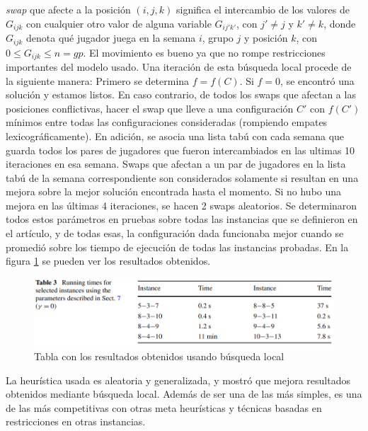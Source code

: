 \documentclass[letter, 10pt]{article}
\begin{document}
\textit{swap} que afecte a la posición $(i,j,k)$ significa el intercambio de los valores de $G_{ijk}$ con cualquier otro valor de alguna variable $G_{ij'k'}$, con $j'\neq j$ y $k'\neq k$, donde $G_{ijk}$ denota qué jugador juega en la semana $i$, grupo $j$ y posición $k$, con $0 \leq G_{ijk} \leq n=gp$. El movimiento es bueno ya que no rompe restricciones importantes del modelo usado. Una iteración de esta búsqueda local procede de la siguiente manera: Primero se determina $f=f(C)$. Si $f=0$, se encontró una solución y estamos listos. En caso contrario, de todos los swaps que afectan a las posiciones conflictivas, hacer el swap que lleve a una configuración $C'$ con $f(C')$ mínimos entre todas las configuraciones consideradas (rompiendo empates lexicográficamente). En adición, se asocia una lista tabú con cada semana que guarda todos los pares de jugadores que fueron intercambiados en las ultimas 10 iteraciones en esa semana. Swaps que afectan a un par de jugadores en la lista tabú de la semana correspondiente son considerados solamente si resultan en una mejora sobre la mejor solución encontrada hasta el momento. Si no hubo una mejora en las últimas 4 iteraciones, se hacen 2 swaps aleatorios. Se determinaron todos estos parámetros en pruebas sobre todas las instancias que se definieron en el artículo, y de todas esas, la configuración dada funcionaba mejor cuando se promedió sobre los tiempo de ejecución de todas las instancias probadas. En la figura \ref{fig:tabla2ts} se pueden ver los resultados obtenidos.

\begin{figure}[h]
    \centering
    \includegraphics[width=\textwidth]{figures/table2_greedyts.png}
    \caption{Tabla con los resultados obtenidos usando búsqueda local}
    \label{fig:tabla2ts}
\end{figure}

La heurística usada es aleatoria y generalizada, y mostró que mejora resultados obtenidos mediante búsqueda local. Además de ser una de las más simples, es una de las más competitivas con otras meta heurísticas y técnicas basadas en restricciones en otras instancias.
\end{document}

